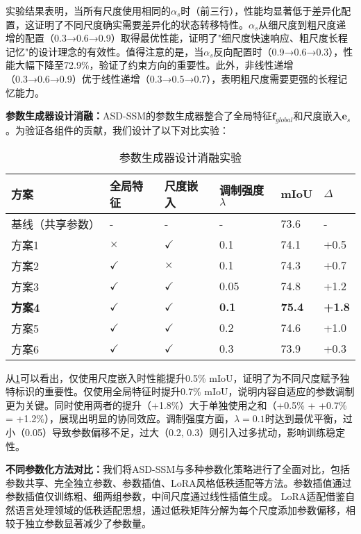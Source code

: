 \documentclass[preprint,12pt]{elsarticle}
\begin{document}
实验结果表明，当所有尺度使用相同的$\alpha_s$时（前三行），性能均显著低于差异化配置，这证明了不同尺度确实需要差异化的状态转移特性。$\alpha_s$从细尺度到粗尺度递增的配置（0.3→0.6→0.9）取得最优性能，证明了"细尺度快速响应、粗尺度长程记忆"的设计理念的有效性。值得注意的是，当$\alpha_s$反向配置时（0.9→0.6→0.3），性能大幅下降至72.9\%，验证了约束方向的重要性。此外，非线性递增（0.3→0.6→0.9）优于线性递增（0.3→0.5→0.7），表明粗尺度需要更强的长程记忆能力。

\textbf{参数生成器设计消融：}ASD-SSM的参数生成器整合了全局特征$\mathbf{f}_{global}$和尺度嵌入$\mathbf{e}_s$。为验证各组件的贡献，我们设计了以下对比实验：

\begin{table}[htbp!]
	\centering
	\caption{参数生成器设计消融实验}
	\label{tab:paramgen_design}
	\begin{tabular}{@{}llllll@{}}
		\toprule
		方案 & 全局特征 & 尺度嵌入 & 调制强度$\lambda$ & mIoU & $\Delta$ \\ 
		\midrule
		基线（共享参数） & - & - & - & 73.6 & - \\
		\midrule
		方案1 & $\times$ & $\checkmark$ & 0.1 & 74.1 & +0.5 \\
		方案2 & $\checkmark$ & $\times$ & 0.1 & 74.3 & +0.7 \\
		方案3 & $\checkmark$ & $\checkmark$ & 0.05 & 74.8 & +1.2 \\
		\textbf{方案4} & $\checkmark$ & $\checkmark$ & \textbf{0.1} & \textbf{75.4} & \textbf{+1.8} \\
		方案5 & $\checkmark$ & $\checkmark$ & 0.2 & 74.6 & +1.0 \\
		方案6 & $\checkmark$ & $\checkmark$ & 0.3 & 73.9 & +0.3 \\
		\bottomrule
	\end{tabular}
\end{table}

从\cref{tab:paramgen_design}可以看出，仅使用尺度嵌入时性能提升0.5\% mIoU，证明了为不同尺度赋予独特标识的重要性。仅使用全局特征时提升0.7\% mIoU，说明内容自适应的参数调制更为关键。同时使用两者的提升（+1.8\%）大于单独使用之和（+0.5\% + +0.7\% = +1.2\%），展现出明显的协同效应。调制强度方面，$\lambda=0.1$时达到最优平衡，过小（0.05）导致参数偏移不足，过大（0.2, 0.3）则引入过多扰动，影响训练稳定性。

\textbf{不同参数化方法对比：}我们将ASD-SSM与多种参数化策略进行了全面对比，包括参数共享、完全独立参数、参数插值、LoRA风格低秩适配等方法。参数插值通过参数插值仅训练粗、细两组参数，中间尺度通过线性插值生成。
LoRA适配借鉴自然语言处理领域的低秩适配思想\cite{lora}，通过低秩矩阵分解为每个尺度添加参数偏移，相较于独立参数显著减少了参数量。
\end{document}
